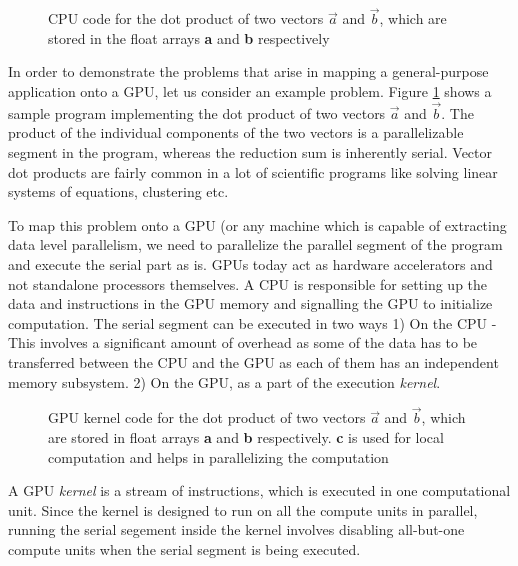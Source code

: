 %
%

\label{sec:motivation}
\begin{figure}
	
	\caption{CPU code for the dot product of two vectors $\vec{a}$ and $\vec{b}$, which are stored in the float arrays \textbf{a} and \textbf{b} respectively
		\label{fig:cpu_vector_dot_code}}
\end{figure}
\par{In order to demonstrate the problems that arise in mapping a general-purpose application onto a GPU, let us consider an example problem. Figure \ref{fig:cpu_vector_dot_code} shows a sample program implementing the dot product of two vectors $\vec{a}$ and $\vec{b}$. The product of the individual components of the two vectors is a parallelizable segment in the program, whereas the reduction sum is inherently serial. Vector dot products are fairly common in a lot of scientific programs like solving linear systems of equations, clustering etc.}

\par{To map this problem onto a GPU (or any machine which is capable of extracting data level parallelism, we need to parallelize the parallel segment of the program and execute the serial part as is. GPUs today act as hardware accelerators and not standalone processors themselves. A CPU is responsible for setting up the data and instructions in the GPU memory and signalling the GPU to initialize computation. The serial segment can be executed in two ways 1) On the CPU - This involves a significant amount of overhead as some of the data has to be transferred between the CPU and the GPU as each of them has an independent memory subsystem. 2) On the GPU, as a part of the execution \textit{kernel}.}

\begin{figure}
	\centering
	
	\caption{GPU kernel code for the dot product of two vectors $\vec{a}$ and $\vec{b}$, which are stored in float arrays \textbf{a} and \textbf{b} respectively. \textbf{c} is used for local computation and helps in parallelizing the computation
		\label{fig:gpu_vector_dot_code}}
\end{figure}

\par{
	A GPU \textit{kernel} is a stream of instructions, which is executed in one computational unit. Since the kernel is designed to run on all the compute units in parallel, running the serial segement inside the kernel involves disabling all-but-one compute units when the serial segment is being executed.
}
